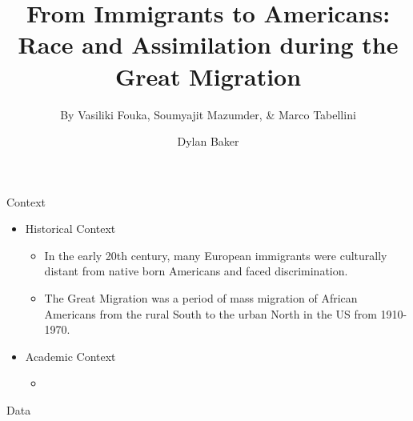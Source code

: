 \documentclass[11pt, aspectratio=169]{beamer}
\begin{document}
\title{From Immigrants to Americans: Race and Assimilation during the Great Migration}
\subtitle{By Vasiliki Fouka, Soumyajit Mazumder, \& Marco Tabellini}
\author{Dylan Baker}

\begin{frame} 
\maketitle
\end{frame}


\begin{frame}{Context}

    \begin{itemize}
        \item Historical Context
            \begin{itemize}
                \item In the early 20th century, many European 
                    immigrants were culturally distant from native born 
                    Americans and faced discrimination.
                \item The Great Migration was a period of mass 
                    migration of African Americans from the rural South 
                    to the urban North in the US from 1910-1970.
            \end{itemize}
        \item Academic Context
            \begin{itemize}
                \item 
            \end{itemize}
    \end{itemize}

\end{frame}

\begin{frame}{Data}

\end{frame}
\end{document}
